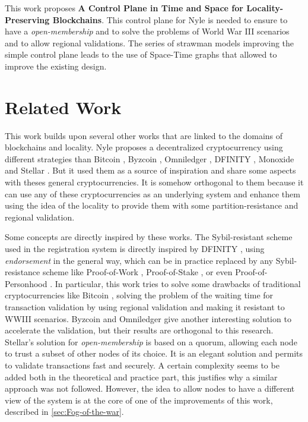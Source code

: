 \documentclass[a4paper,11pt,oneside]{report}
\begin{document}

This work proposes \textbf{A Control Plane in Time and Space for
Locality-Preserving Blockchains}. This control plane for Nyle is needed to
ensure to have a \textit{open-membership} and to solve the problems of World
War III scenarios and to allow regional validations. The series of strawman
models improving the simple control plane leads to the use of Space-Time graphs
that allowed to improve the existing design. 



\chapter{Related Work} \label{chap:RelatedWork} %

This work builds upon several other works that are linked to the domains of
blockchains and locality. Nyle proposes a decentralized cryptocurrency using
different strategies than Bitcoin \cite{Nakamoto2009}, Byzcoin \cite{Kogias2016},
Omniledger \cite{Kokoris-Kogias2017}, DFINITY \cite{Hanke2018}, Monoxide
\cite{Wang2019} and Stellar \cite{Lokhava2019}. But it used them as a source of inspiration
and share some aspects with theses general cryptocurrencies. It is
somehow orthogonal to them because it can use any of these cryptocurrencies as
an underlying system and enhance them using the idea of the locality to provide them with some
partition-resistance and regional validation. 

Some concepts are directly inspired by these works. The Sybil-resistant scheme used in the registration system is directly inspired by DFINITY
\cite{Hanke2018}, using \textit{endorsement} in the general way, which can be
in practice replaced by any Sybil-resistance scheme like Proof-of-Work
\cite{Nakamoto2009}, Proof-of-Stake \cite{wood2014ethereum}, or even
Proof-of-Personhood \cite{Borge2017}. In particular, this work tries to solve
some drawbacks of traditional cryptocurrencies like Bitcoin \cite{Nakamoto2009},
solving the problem of the waiting time for transaction validation by using regional
validation and making it resistant to WWIII scenarios. Byzcoin
\cite{Kogias2016} and Omniledger \cite{Kokoris-Kogias2017} give another
interesting solution to accelerate the validation, but their results are
orthogonal to this research. Stellar's solution for \textit{open-membership}
\cite{Lokhava2019} is based on a quorum, allowing each node to trust a subset
of other nodes of its choice. It is an elegant solution and permits to validate
transactions fast and securely. A certain complexity seems to be added both in
the theoretical and practice part, this justifies why a similar approach was not
followed. However, the idea to allow nodes to have a different view of the
system is at the core of one of the improvements of this work, described in \autoref{sec:Fog-of-the-war}.
\end{document}
